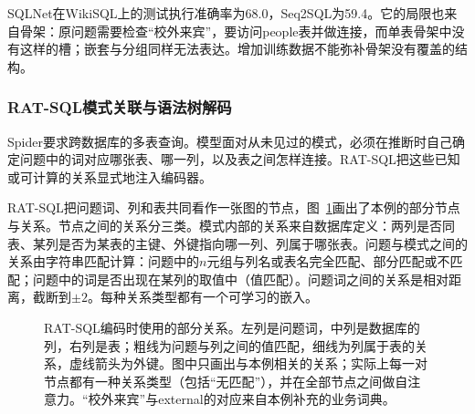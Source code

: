 SQLNet在WikiSQL上的测试执行准确率为68.0，Seq2SQL为59.4。它的局限也来自骨架：原问题需要检查“校外来宾”，要访问people表并做连接，而单表骨架中没有这样的槽；嵌套与分组同样无法表达。增加训练数据不能弥补骨架没有覆盖的结构。

\subsubsection{RAT-SQL模式关联与语法树解码}
\label{sec:nlp-analysis-ratsql}

Spider要求跨数据库的多表查询。模型面对从未见过的模式，必须在推断时自己确定问题中的词对应哪张表、哪一列，以及表之间怎样连接。RAT-SQL把这些已知或可计算的关系显式地注入编码器。

RAT-SQL把问题词、列和表共同看作一张图的节点，图~\ref{fig:nlp-analysis-ratsql-graph}画出了本例的部分节点与关系。节点之间的关系分三类。模式内部的关系来自数据库定义：两列是否同表、某列是否为某表的主键、外键指向哪一列、列属于哪张表。问题与模式之间的关系由字符串匹配计算：问题中的$n$元组与列名或表名完全匹配、部分匹配或不匹配；问题中的词是否出现在某列的取值中（值匹配）。问题词之间的关系是相对距离，截断到$\pm2$。每种关系类型都有一个可学习的嵌入。

\begin{figure}[htbp]
  \centering
  
  \caption{RAT-SQL编码时使用的部分关系。左列是问题词，中列是数据库的列，右列是表；粗线为问题与列之间的值匹配，细线为列属于表的关系，虚线箭头为外键。图中只画出与本例相关的关系；实际上每一对节点都有一种关系类型（包括“无匹配”），并在全部节点之间做自注意力。“校外来宾”与external的对应来自本例补充的业务词典。}
  \label{fig:nlp-analysis-ratsql-graph}
\end{figure}

